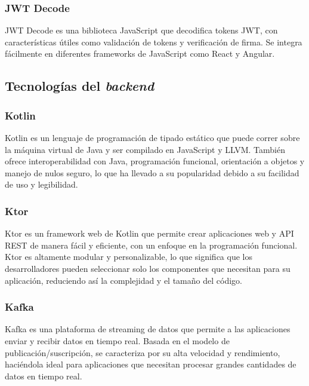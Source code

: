 \subsubsection{JWT Decode}

JWT Decode \citep{jwt-decode} es una biblioteca JavaScript que decodifica tokens JWT, con características útiles como validación de tokens y verificación de firma. Se integra fácilmente en diferentes frameworks de JavaScript como React y Angular.


\subsection{Tecnologías del \textit{backend}}


\subsubsection{Kotlin}

Kotlin \citep{kotlin} es un lenguaje de programación de tipado estático que puede correr sobre la máquina virtual de Java y ser compilado en JavaScript y LLVM. También ofrece interoperabilidad con Java, programación funcional, orientación a objetos y manejo de nulos seguro, lo que ha llevado a su popularidad debido a su facilidad de uso y legibilidad.


\subsubsection{Ktor}

Ktor \citep{ktor} es un framework web de Kotlin que permite crear aplicaciones web y API REST de manera fácil y eficiente, con un enfoque en la programación funcional. Ktor es altamente modular y personalizable, lo que significa que los desarrolladores pueden seleccionar solo los componentes que necesitan para su aplicación, reduciendo así la complejidad y el tamaño del código. 


\subsubsection{Kafka}

Kafka \citep{kafka} es una plataforma de streaming de datos que permite a las aplicaciones enviar y recibir datos en tiempo real. Basada en el modelo de publicación/suscripción, se caracteriza por su alta velocidad y rendimiento, haciéndola ideal para aplicaciones que necesitan procesar grandes cantidades de datos en tiempo real.

